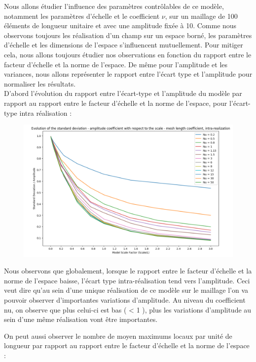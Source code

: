 \documentclass[a4paper,10pt]{article}
\begin{document}
	Nous allons  étudier l'influence des paramètres contrôlables de ce modèle, notamment les paramètres d'échelle et le coefficient $\nu$, sur un maillage de 100 éléments de longueur unitaire et avec une amplitude fixée à 10. 
	Comme nous observons toujours les réalisation d'un champ sur un espace borné, les paramètres d'échelle et les dimensions de l'espace s'influencent mutuellement. Pour mitiger cela, nous allons toujours étudier nos observations en fonction du rapport entre le facteur d'échelle et la norme de l'espace. De même pour l'amplitude et les variances, nous allons représenter le rapport entre l'écart type et l'amplitude pour normaliser les résultats. \\
	
	D'abord l'évolution du rapport entre l'écart-type et l'amplitude du modèle par rapport au rapport entre le facteur d'échelle et la norme de l'espace, pour l'écart-type intra réalisation : 
	
\begin{figure}[H]
   \centering   
   \noindent \includegraphics[width = \linewidth]{stdDevIntra.png}
      \caption{}
         \label{stdDevIntra}
\end{figure}
	
	Nous observons que globalement, lorsque le rapport entre le facteur d'échelle et la norme de l'espace baisse, l'écart type intra-réalisation tend vers l'amplitude. Ceci veut dire qu'au sein d'une unique réalisation de ce modèle sur le maillage l'on va pouvoir observer d'importantes variations d'amplitude.
	Au niveau du coefficient nu, on observe que plus celui-ci est bas ( < 1 ), plus les variations d'amplitude au sein d'une même réalisation vont être importantes. 
	
	On peut aussi observer le nombre de moyen maximums locaux par unité de longueur par rapport au rapport entre le facteur d'échelle et la norme de l'espace : 
	
\end{document}
